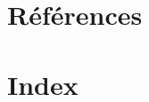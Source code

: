 \documentclass[12pt, a4paper]{article}
\begin{document}
\section{Références}

\printbibliography[heading=none]

\section{Index}

\printindex
\end{document}
